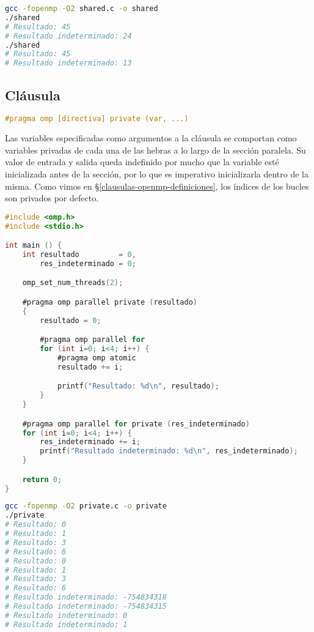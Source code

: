 \begin{lstlisting}[language=sh]
gcc -fopenmp -O2 shared.c -o shared
./shared
# Resultado: 45
# Resultado indeterminado: 24
./shared
# Resultado: 45
# Resultado indeterminado: 13
\end{lstlisting}

\subsection{Cláusula }

\begin{lstlisting}[language=C]
#pragma omp [directiva] private (var, ...)
\end{lstlisting}

Las variables especificadas como argumentos a la cláusula se comportan como variables privadas de cada una de las hebras a lo largo de la sección paralela.
Su valor de entrada y salida queda indefinido por mucho que la variable esté inicializada antes de la sección, por lo que es imperativo inicializarla dentro de la misma.
Como vimos en \S\ref{clausulas-openmp-definiciones}, los índices de los bucles  son privados por defecto.

\begin{lstlisting}[language=C]
#include <omp.h>
#include <stdio.h>

int main () {
	int resultado         = 0,
	    res_indeterminado = 0;

	omp_set_num_threads(2);

	#pragma omp parallel private (resultado)
	{
		resultado = 0;

		#pragma omp parallel for
		for (int i=0; i<4; i++) {
			#pragma omp atomic
			resultado += i;

			printf("Resultado: %d\n", resultado);
		}
	}

	#pragma omp parallel for private (res_indeterminado)
	for (int i=0; i<4; i++) {
		res_indeterminado += i;
		printf("Resultado indeterminado: %d\n", res_indeterminado);
	}

	return 0;
}
\end{lstlisting}

\begin{lstlisting}[language=sh]
gcc -fopenmp -O2 private.c -o private
./private
# Resultado: 0
# Resultado: 1
# Resultado: 3
# Resultado: 6
# Resultado: 0
# Resultado: 1
# Resultado: 3
# Resultado: 6
# Resultado indeterminado: -754834318
# Resultado indeterminado: -754834315
# Resultado indeterminado: 0
# Resultado indeterminado: 1
\end{lstlisting}

